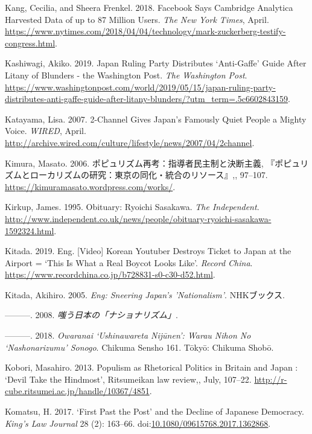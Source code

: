 \documentclass[10pt,british,A4paper,,openany]{memoir}
\begin{document}
\hypertarget{ref-kang_facebook_2018}{}
Kang, Cecilia, and Sheera Frenkel. 2018. Facebook Says Cambridge
Analytica Harvested Data of up to 87 Million Users. \emph{The New York
Times}, April.
\url{https://www.nytimes.com/2018/04/04/technology/mark-zuckerberg-testify-congress.html}.

\hypertarget{ref-kashiwagi_japan_2019}{}
Kashiwagi, Akiko. 2019. Japan Ruling Party Distributes `Anti-Gaffe'
Guide After Litany of Blunders - the Washington Post. \emph{The
Washington Post}.
\url{https://www.washingtonpost.com/world/2019/05/15/japan-ruling-party-distributes-anti-gaffe-guide-after-litany-blunders/?utm_term=.5c6602843159}.

\hypertarget{ref-katayama_2-channel_2007}{}
Katayama, Lisa. 2007. 2-Channel Gives Japan's Famously Quiet People a
Mighty Voice. \emph{WIRED}, April.
\url{http://archive.wired.com/culture/lifestyle/news/2007/04/2channel}.

\hypertarget{ref-kimura__2006}{}
Kimura, Masato. 2006. ポピュリズム再考：指導者民主制と決断主義,
『ポピュリズムとローカリズムの研究：東京の同化・統合のリソース』,,
97--107. \url{https://kimuramasato.wordpress.com/works/}.

\hypertarget{ref-kirkup_obituary:_1995}{}
Kirkup, James. 1995. Obituary: Ryoichi Sasakawa. \emph{The Independent}.
\url{http://www.independent.co.uk/news/people/obituary-ryoichi-sasakawa-1592324.html}.

\hypertarget{ref-kitada_eng._2019}{}
Kitada. 2019. Eng. {[}Video{]} Korean Youtuber Destroys Ticket to Japan
at the Airport = `This Is What a Real Boycot Looks Like'. \emph{Record
China}. \url{https://www.recordchina.co.jp/b728831-s0-c30-d52.html}.

\hypertarget{ref-kitada_eng:_2005}{}
Kitada, Akihiro. 2005. \emph{Eng: Sneering Japan's 'Nationalism'}.
NHKブックス.

\hypertarget{ref-kitada__2008}{}
---------. 2008. \emph{嗤う日本の「ナショナリズム」}.

\hypertarget{ref-kitada_owaranai_2018}{}
---------. 2018. \emph{Owaranai `Ushinawareta Nijūnen': Warau Nihon No
`Nashonarizumu' Sonogo}. Chikuma Sensho 161. Tōkyō: Chikuma Shobō.

\hypertarget{ref-kobori_populism_2013}{}
Kobori, Masahiro. 2013. Populism as Rhetorical Politics in Britain and
Japan : `Devil Take the Hindmost', Ritsumeikan law review,, July,
107--22. \url{http://r-cube.ritsumei.ac.jp/handle/10367/4851}.

\hypertarget{ref-komatsu_first_2017}{}
Komatsu, H. 2017. `First Past the Post' and the Decline of Japanese
Democracy. \emph{King's Law Journal} 28 (2): 163--66.
doi:\href{https://doi.org/10.1080/09615768.2017.1362868}{10.1080/09615768.2017.1362868}.
\end{document}
